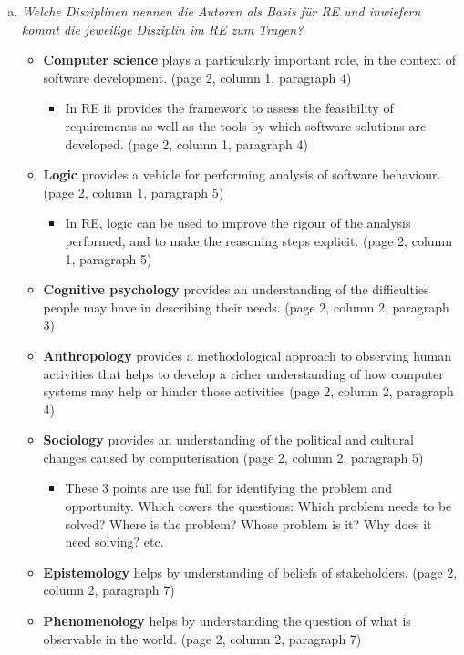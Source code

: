 \begin{enumerate}[a)]
\newpage 
    \item {\itshape Welche Disziplinen nennen die Autoren als Basis für RE und inwiefern kommt die jeweilige Disziplin im RE zum Tragen?}
    \begin{itemize}
        \item \textbf{Computer  science} plays a particularly important role, in  the  context  of  software  development. (page 2, column 1, paragraph 4)
        \begin{itemize}
            \item In RE it provides the framework to assess the feasibility of requirements as well as the tools by which software solutions are developed. (page 2, column 1, paragraph 4)
        \end{itemize}
        \item \textbf{Logic} provides a vehicle for performing analysis of software behaviour. (page 2, column 1, paragraph 5)
        \begin{itemize}
            \item In  RE, logic can be used to improve the rigour of the analysis performed, and to make the reasoning steps explicit. (page 2, column 1, paragraph 5)
        \end{itemize}
        \item \textbf{Cognitive psychology} provides an understanding of the difficulties people may have in describing their needs. (page 2, column 2, paragraph 3)
        \item \textbf{Anthropology} provides a methodological approach to observing human activities that helps to develop a richer understanding of how computer systems may help or hinder those activities (page 2, column 2, paragraph 4)
        \item \textbf{Sociology} provides an understanding of the political and cultural changes caused by computerisation (page 2, column 2, paragraph 5)
        \begin{itemize}
            \item These 3 points are use full for identifying the problem and opportunity. Which covers the questions: Which problem needs to be solved? Where is the problem? Whose problem is it? Why does it need solving? etc.
        \end{itemize}
        \item \textbf{Epistemology} helps by understanding of beliefs of stakeholders. (page 2, column 2, paragraph 7)
        \item \textbf{Phenomenology} helps by understanding the question of what is observable in the world. (page 2, column 2, paragraph 7)

\end{itemize}
\end{enumerate}
